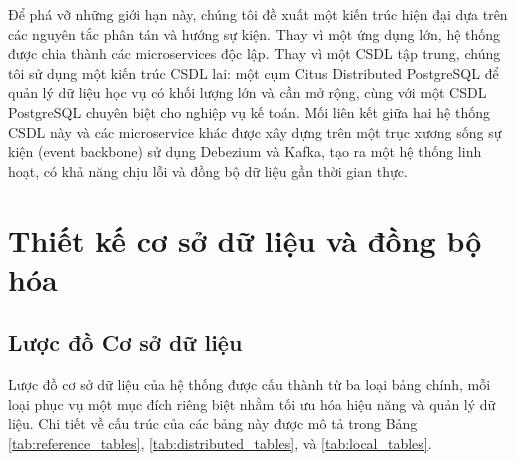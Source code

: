 \documentclass[conference]{IEEEtran}
\begin{document}
Để phá vỡ những giới hạn này, chúng tôi đề xuất một kiến trúc hiện đại dựa trên các nguyên tắc phân tán và hướng sự kiện. Thay vì một ứng dụng lớn, hệ thống được chia thành các microservices độc lập. Thay vì một CSDL tập trung, chúng tôi sử dụng một kiến trúc CSDL lai: một cụm Citus Distributed PostgreSQL để quản lý dữ liệu học vụ có khối lượng lớn và cần mở rộng, cùng với một CSDL PostgreSQL chuyên biệt cho nghiệp vụ kế toán. Mối liên kết giữa hai hệ thống CSDL này và các microservice khác được xây dựng trên một trục xương sống sự kiện (event backbone) sử dụng Debezium và Kafka, tạo ra một hệ thống linh hoạt, có khả năng chịu lỗi và đồng bộ dữ liệu gần thời gian thực.

\section{Thiết kế cơ sở dữ liệu và đồng bộ hóa}

\subsection{Lược đồ Cơ sở dữ liệu}
Lược đồ cơ sở dữ liệu của hệ thống được cấu thành từ ba loại bảng chính, mỗi loại phục vụ một mục đích riêng biệt nhằm tối ưu hóa hiệu năng và quản lý dữ liệu. Chi tiết về cấu trúc của các bảng này được mô tả trong Bảng \ref{tab:reference_tables}, \ref{tab:distributed_tables}, và \ref{tab:local_tables}.
\end{document}
